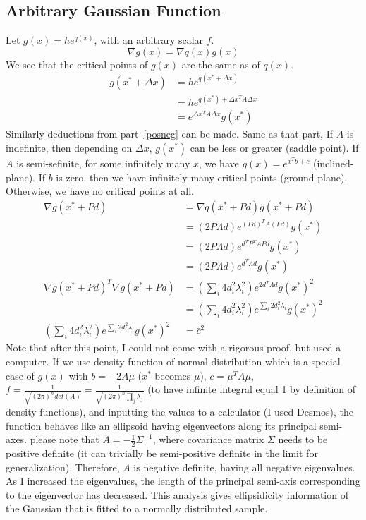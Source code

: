 \documentclass{book}
\numberwithin{equation}{subsection}
\begin{document}
\subsection{Arbitrary Gaussian Function}
Let $g(x) = he^{q(x)}$, with an arbitrary scalar $f$. 
\begin{equation}
    \nabla g(x) = \nabla q(x) g(x)
\end{equation}
We see that the critical points of $g(x)$ are the same as of $q(x)$. 
\begin{align}
    g(x^*+\Delta x) &= he^{q(x^*+\Delta x)}\\
     &= he^{q(x^*) + \Delta x^TA\Delta x}\\
     &= e^{\Delta x^TA\Delta x}g(x^*)
\end{align}
Similarly deductions from part~\ref{posneg} can be made. Same as that part, If $A$ is indefinite, then depending on $\Delta x$, $g(x^*)$ can be less or greater (saddle point). If $A$ is semi-sefinite, for some infinitely many $x$, we have $g(x) = e^{x^Tb+c}$ (inclined-plane). If $b$ is zero, then we have infinitely many critical points (ground-plane). Otherwise, we have no critical points at all.
\begin{align}
    \nabla g(x^*+Pd) &= \nabla q(x^*+Pd) g(x^*+Pd)\\
    &= (2P\Lambda d) e^{(Pd)^TA(Pd)}g(x^*)\\
    &= (2P\Lambda d) e^{d^TP^TAPd}g(x^*)\\
    &= (2P\Lambda d) e^{d^T\Lambda d}g(x^*)\\
    \nabla g(x^*+Pd)^T \nabla g(x^*+Pd) &= (\sum_i 4d_i^2\lambda_i^2)e^{2d^T\Lambda d}g(x^*)^2\\
    &= (\sum_i 4d_i^2\lambda_i^2)e^{\sum_i 2d_i^2\lambda_i}g(x^*)^2\\
    (\sum_i 4d_i^2\lambda_i^2)e^{\sum_i 2d_i^2\lambda_i}g(x^*)^2 &= \bar{c}^2
\end{align}
Note that after this point, I could not come with a rigorous proof, but used a computer.
If we use density function of normal distribution which is a special case of $g(x)$ with $b=-2A\mu$ ($x^*$ becomes $\mu$), $c=\mu^TA\mu$, $f = \frac{1}{\sqrt{(2\pi)^n}det(A)} = \frac{1}{\sqrt{(2\pi)^n\prod_j \lambda_j}}$ (to have infinite integral equal 1 by definition of density functions), and inputting the values to a calculator (I used Desmos), the function behaves like an ellipsoid having eigenvectors along its principal semi-axes. please note that $A=-\frac{1}{2}\Sigma^{-1}$, where covariance matrix $\Sigma$ needs to be positive definite (it can trivially be semi-positive definite in the limit for generalization). Therefore, $A$ is negative definite, having all negative eigenvalues. As I increased the eigenvalues, the length of the principal semi-axis corresponding to the eigenvector has decreased. 
This analysis gives ellipsidicity information of the Gaussian that is fitted to a normally distributed sample. 
\end{document}
